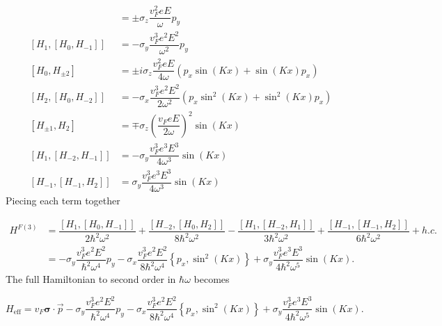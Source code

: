 \begin{align}
  [H_{0}, H_{\pm1}] &= \pm \sigma_z \dfrac{v_{F}^{2} eE}{\omega} p_y \nonumber \\
  [H_{1}, [H_{0}, H_{-1}]] &= - \sigma_y \dfrac{v_{F}^3 e^2 E^2}{\omega^2} p_y \\
  [H_{0}, H_{\pm2}] &= \pm i \sigma_z \dfrac{v_{F}^{2} eE}{4\omega} \left(p_x \sin{(Kx)} + \sin{(Kx)} p_x \right) \nonumber \\
  [H_{2}, [H_{0}, H_{-2}]] &= - \sigma_x \dfrac{v_{F}^3 e^2 E^2}{2 \omega^2} \left( p_x \sin^2{(Kx)} + \sin^2{(Kx)} p_x \right) \\
  [H_{\pm1}, H_{2}] &= \mp \sigma_z \left(\dfrac{v_{F} eE}{2\omega} \right)^{2} \sin{(Kx)} \nonumber \\
  [H_{1}, [H_{-2},H_{-1}]] &= - \sigma_y \dfrac{v_{F}^{3} e^3 E^3}{4\omega^3} \sin{(Kx)} \\
  [H_{-1},[H_{-1},H_{2}]] &=  \sigma_y \dfrac{v_{F}^3 e^3 E^3}{4\omega^3} \sin{(Kx)}
\end{align}
Piecing each term together

\begin{align}
  H^{F(3)} &= \dfrac{[H_{1}, [H_{0}, H_{-1}]]}{2\hbar^2\omega^2} + \dfrac{[H_{-2}, [H_{0}, H_{2}]]}{8\hbar^2\omega^2} - \dfrac{[H_{1}, [H_{-2}, H_{1}]]}{3\hbar^2\omega^2} + \dfrac{[H_{-1}, [H_{-1}, H_{2}]]}{6\hbar^2\omega^2} + h.c. \nonumber \\
  &= -\sigma_y \dfrac{v_{F}^3 e^2 E^2}{\hbar^2 \omega^4} p_y - \sigma_x \dfrac{ v_{F}^3 e^2 E^2}{8\hbar^2\omega^4} \left\{p_x, \sin^2{(Kx)}\right\} + \sigma_y \dfrac{v_{F}^3 e^3 E^3}{4\hbar^2\omega^5} \sin{(Kx)}.
\end{align}
The full Hamiltonian to second order in $\hbar\omega$ becomes

\begin{equation}
  H_{\text{eff}} = v_{F} \bm{\sigma} \cdot \vec{p} -\sigma_y \dfrac{v_{F}^3 e^2 E^2}{\hbar^2 \omega^4} p_y - \sigma_x \dfrac{ v_{F}^3 e^2 E^2}{8\hbar^2\omega^4} \left\{p_x, \sin^2{(Kx)}\right\} + \sigma_y \dfrac{v_{F}^3 e^3 E^3}{4\hbar^2\omega^5} \sin{(Kx)}.
\end{equation}
